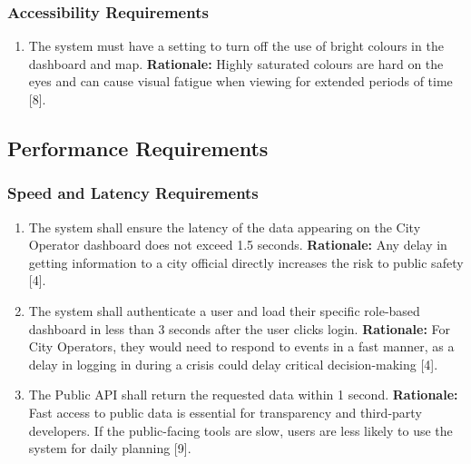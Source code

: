 \documentclass[]{article}
\begin{document}
\subsubsection{Accessibility Requirements}
\label{ssub:accessibility_requirements}
\begin{enumerate}[{UH-A}1. ]
	\item The system must have a setting to turn off the use of bright colours in the dashboard and map.\newline
	{\bf Rationale:} Highly saturated colours are hard on the eyes and can cause visual fatigue when viewing for extended periods of time [8].
\end{enumerate}


\subsection{Performance Requirements}
\label{sub:performance_requirements}

\subsubsection{Speed and Latency Requirements}
\label{ssub:speed_and_latency_requirements}
\begin{enumerate}[{PR-SL}1. ]
	\item The system shall ensure the latency of the data appearing on the City Operator dashboard does not exceed 1.5 seconds.\newline
	{\bf Rationale:} Any delay in getting information to a city official directly increases the risk to public safety [4].
	\item The system shall authenticate a user and load their specific role-based dashboard in less than 3 seconds after the user clicks login.\newline
	{\bf Rationale:} For City Operators, they would need to respond to events in a fast manner, as a delay in logging in during a crisis could delay critical decision-making [4].
	\item The Public API shall return the requested data within 1 second.\newline
	{\bf Rationale:} Fast access to public data is essential for transparency and third-party developers. If the public-facing tools are slow, users are less likely to use the system for daily planning [9].
\end{enumerate}
\end{document}
